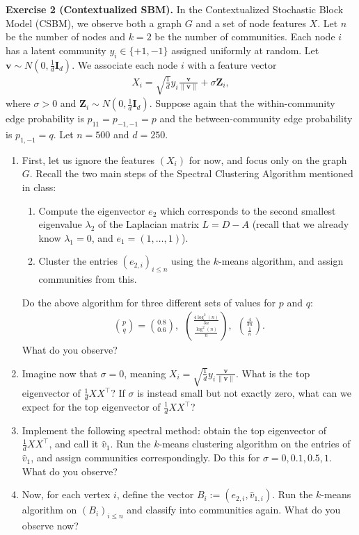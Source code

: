 \documentclass{article}
\begin{document}
\begin{tcolorbox}[colback = gray!16, enhanced, boxrule=0pt, frame hidden, sharp corners, borderline west={3pt}{-1.5pt}{black!80},breakable]
\textbf{Exercise 2 (Contextualized SBM).} In the Contextualized Stochastic Block Model (CSBM), we observe both a graph $G$
and a set of node features $X$. Let $n$ be the number of nodes and $k= 2$ be the number of communities. Each node $i$ has a latent community $y_i \in\{+1,-1\}$ assigned uniformly
at random. Let $\bm v \sim N(0,\tfrac1d\mathbf I_d)$. We associate each node $i$ with a feature vector
\begin{align}
    X_i = \sqrt{\frac{1}{d}}y_i\frac{\bm v}{\|\bm v\|} + \sigma \mathbf Z_i,
\end{align}
where $\sigma > 0$ and $\mathbf Z_i \sim N(0, \tfrac1d\mathbf I_d)$. Suppose again that the within-community edge probability is $p_{11} = p_{-1, -1} = p$ and the between-community edge probability is $p_{1, -1} = q$. Let $n = 500$ and $d = 250$.
\begin{enumerate}[$(a)$]
    \item First, let us ignore the features $(X_i)$ for now, and focus only on the graph $G$. Recall the two main steps of the Spectral Clustering Algorithm mentioned in class:
    \begin{enumerate}[1.]
        \item Compute the eigenvector $e_2$ which corresponds to the second smallest eigenvalue $\lambda_2$ of the Laplacian matrix $L =  D-A$ (recall that we already know $\lambda_1 = 0$, and $e_1 = (1, \hdots, 1)$).
        \item Cluster the entries $(e_{2, i})_{i\leq n}$ using the $k$-means algorithm, and assign communities from this.
    \end{enumerate}
    Do the above algorithm for three different sets of values for $p$ and $q$:
    \begin{align}
        {p \choose q} = {0.8 \choose 0.6},\ \ {\frac{4\log^2(n)}{3n}\choose \frac{\log^2(n)}{n}},\ \ {\frac{4}{3n}\choose\frac1n}.
    \end{align}
    What do you observe?
    \item Imagine now that $\sigma = 0$, meaning $X_i = \sqrt{\frac{1}{d}}y_i\frac{\bm v}{\|\bm v\|}$. What is the top eigenvector of $\tfrac1dXX^\intercal$? If $\sigma$ is instead small but not exactly zero, what can we expect for the top eigenvector of $\tfrac1dXX^\intercal$?
    \item Implement the following spectral method: obtain the top eigenvector of $\tfrac1dXX^\intercal$, and call it $\hat v_1$. Run the $k$-means clustering algorithm on the entries of $\hat v_1$, and assign communities correspondingly. Do this for $\sigma = 0, 0.1, 0.5, 1.$ What do you observe?
    \item Now, for each vertex $i$, define the vector $B_i := (e_{2, i}, \hat v_{1, i})$. Run the $k$-means algorithm on $(B_i)_{i\leq n}$ and classify into communities again. What do you observe now?
\end{enumerate}
\end{tcolorbox}
\end{document}
